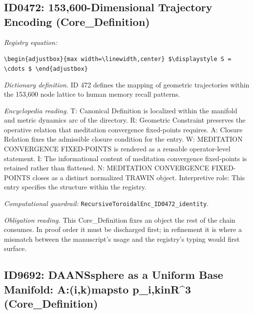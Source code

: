 \documentclass[11pt]{article}
\theoremstyle{remark}
\begin{document}
\subsection{ID0472: 153,600-Dimensional Trajectory Encoding (Core\_Definition)}

\noindent\textit{Registry equation:}\par
{\small\texttt{\textbackslash{}begin\{adjustbox\}\{max width=\textbackslash{}linewidth,center\} \$\textbackslash{}displaystyle S = \textbackslash{}cdots \$ \textbackslash{}end\{adjustbox\}}}\par\medskip
\noindent\textit{Dictionary definition.} ID 472 defines the mapping of geometric trajectories within the 153,600 node lattice to human memory recall patterns.\par\medskip
\noindent\textit{Encyclopedia reading.} T: Canonical Definition is localized within the manifold and metric dynamics arc of the directory. R: Geometric Constraint preserves the operative relation that meditation convergence fixed-points requires. A: Closure Relation fixes the admissible closure condition for the entry. W: MEDITATION CONVERGENCE FIXED-POINTS is rendered as a reusable operator-level statement. I: The informational content of meditation convergence fixed-points is retained rather than flattened. N: MEDITATION CONVERGENCE FIXED-POINTS closes as a distinct normalized TRAWIN object. Interpretive role: This entry specifies the structure within the registry.
\par\medskip\noindent\textit{Computational guardrail:} \texttt{RecursiveToroidalEnc\_ID0472\_identity}.
\par\medskip\noindent\textit{Obligation reading.} This Core\_Definition fixes an object the rest of the chain consumes. In proof order it must be discharged first; in refinement it is where a mismatch between the manuscript's usage and the registry's typing would first surface.

\subsection{ID9692: DAANSsphere as a Uniform Base Manifold: A:(i,k)mapsto p\_i,kinR\textasciicircum{}3 (Core\_Definition)}
\end{document}
